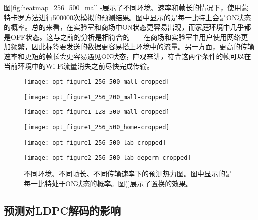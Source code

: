 图\ref{fig:heatmap_256_500_mall}-展示了不同环境、速率和帧长的情况下，使用蒙特卡罗方法进行500000次模拟的预测结果。图中显示的是每一比特上会是ON状态的概率。总的来看，在实验室和商场中ON状态更容易出现，而家庭环境中几乎都是OFF状态。这与之前的分析是相符合的——在商场和实验室中用户使用网络更加频繁，因此标签要发送的数据更容易搭上环境中的流量。另一方面，更高的传输速率和更短的帧长会更容易遇见ON状态，直观来讲，符合这两个条件的帧可以在当前环境中的Wi-Fi流量消失之前尽快完成传输。
\begin{figure}[t]
	\begin{minipage}[b]{.32\linewidth}
		\texttt{[image: opt\_figure1\_256\_500\_mall-cropped]}
		\label{fig:heatmap_256_500_mall}
	\end{minipage}
	\hfill
	\begin{minipage}[b]{.32\linewidth}
		\texttt{[image: opt\_figure1\_256\_200\_mall-cropped]}
		\label{fig:heatmap_256_200_mall}
	\end{minipage}
	\hfill
	\begin{minipage}[b]{.32\linewidth}
		\texttt{[image: opt\_figure1\_128\_500\_mall-cropped]}
		\label{fig:heatmap_128_500_mall}
	\end{minipage}
	
	\begin{minipage}[b]{.32\linewidth}
		\texttt{[image: opt\_figure1\_256\_500\_home-cropped]}
		\label{fig:heatmap_256_500_home}
	\end{minipage}
	\hfill
	\begin{minipage}[b]{.32\linewidth}
		\texttt{[image: opt\_figure1\_256\_500\_lab-cropped]}
		\label{fig:heatmap_256_500_lab}
	\end{minipage}
	\hfill
	\begin{minipage}[b]{.32\linewidth}
		\texttt{[image: opt\_figure2\_256\_500\_lab\_deperm-cropped]}
		\label{fig:heatmap_perm}
	\end{minipage}
	\caption{不同环境、不同帧长、不同传输速率下的预测热力图。图中显示的是每一比特处于ON状态的概率。图()展示了置换的效果。}\label{fig:heatmap}
\end{figure}

\subsection{预测对LDPC解码的影响}

